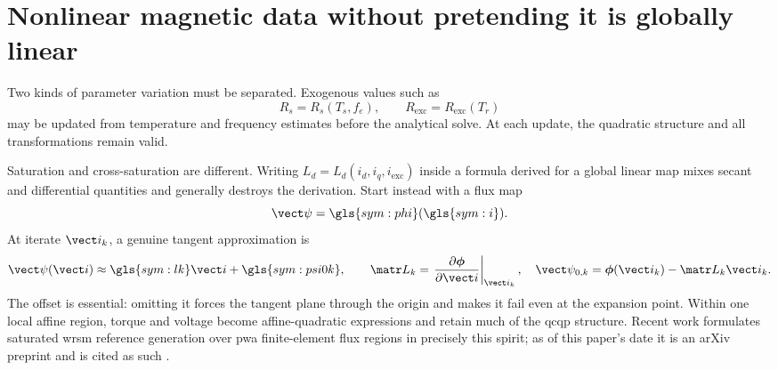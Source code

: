 \section{Nonlinear magnetic data without pretending it is globally linear}
\label{sec:nonlinear}

Two kinds of parameter variation must be separated. Exogenous values such as
\begin{equation}
 R_s=R_s(T_s,f_e),\qquad R_{\mathrm{exc}}=R_{\mathrm{exc}}(T_r)
\end{equation}
may be updated from temperature and frequency estimates before the analytical
solve. At each update, the quadratic structure and all transformations remain
valid.

Saturation and cross-saturation are different. Writing
\(L_d=L_d(i_d,i_q,i_{\mathrm{exc}})\) inside a formula derived for a global
linear map mixes secant and differential quantities and generally destroys
the derivation. Start instead with a flux map
\begin{equation}
 \vect\psi=\gls{sym:phi}(\gls{sym:i}).
\end{equation}
At iterate \(\vect i_k\), a genuine tangent approximation is
\begin{equation}
 \vect\psi(\vect i)\approx
 \gls{sym:lk}\vect i+\gls{sym:psi0k},\qquad
 \matr L_k=\left.\frac{\partial\boldsymbol\phi}{\partial\vect i}
 \right|_{\vect i_k},\quad
 \vect\psi_{0,k}=\boldsymbol\phi(\vect i_k)-\matr L_k\vect i_k.
 \label{eq:local-affine-flux}
\end{equation}
The offset is essential: omitting it forces the tangent plane through the
origin and makes it fail even at the expansion point. Within one local affine
region, torque and voltage become affine-quadratic expressions and retain much
of the \gls{qcqp} structure. Recent work formulates saturated \gls{wrsm}
reference generation over \gls{pwa} finite-element flux regions in precisely
this spirit; as of this paper's date it is an arXiv preprint and is cited as
such \cite{parsonscherban2026}.



